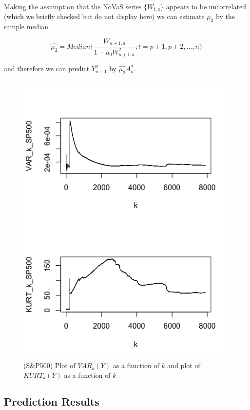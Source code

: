 \documentclass[11pt,]{article}
\begin{document}
Making the assumption that the NoVaS series $\{W_{t,a}\}$ appears to be uncorrelated (which we briefly checked but do not display here) we can estimate $\mu_2$ by the sample median

\begin{equation}
\hat{\mu_{2}} = Median\{\frac{W_{n+1,a}}{1 - a_0W_{n+1,a}^2}; t=p+1,p+2,\dots,n\}
\end{equation}

and therefore we can predict $Y_{n+1}^2$ by $\hat{\mu_{2}}A_{n}^2$.

\begin{figure}
\includegraphics[width=1.0\textwidth]{kurtvar.png}
\caption{\label{kurtvar} (S$\&$P500) Plot of $VAR_k(Y)$ as a function of $k$ and plot of $KURT_k(Y)$ as a function of $k$}
\end{figure}

\subsection{Prediction Results}
\end{document}
